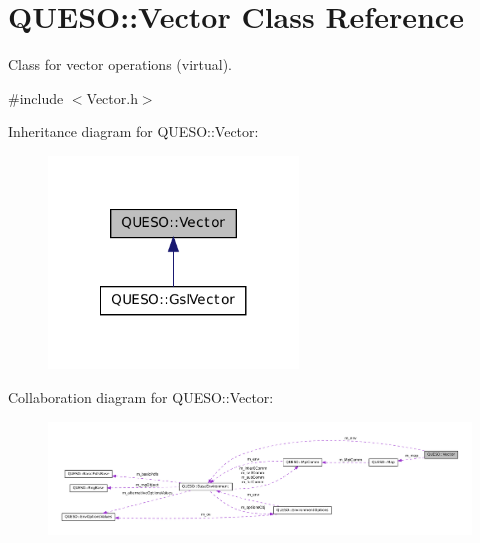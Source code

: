 \hypertarget{class_q_u_e_s_o_1_1_vector}{\section{Q\-U\-E\-S\-O\-:\-:Vector Class Reference}
\label{class_q_u_e_s_o_1_1_vector}
}


Class for vector operations (virtual).  




{\ttfamily \#include $<$Vector.\-h$>$}



Inheritance diagram for Q\-U\-E\-S\-O\-:\-:Vector\-:
\nopagebreak
\begin{figure}[H]
\begin{center}
\leavevmode
\includegraphics[width=188pt]{class_q_u_e_s_o_1_1_vector__inherit__graph}
\end{center}
\end{figure}


Collaboration diagram for Q\-U\-E\-S\-O\-:\-:Vector\-:
\nopagebreak
\begin{figure}[H]
\begin{center}
\leavevmode
\includegraphics[width=350pt]{class_q_u_e_s_o_1_1_vector__coll__graph}
\end{center}
\end{figure}
